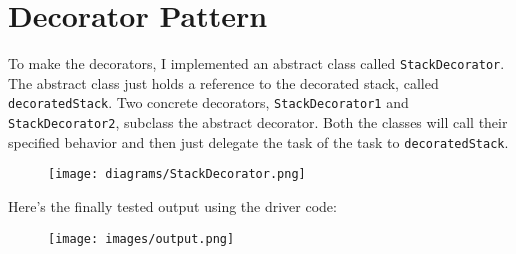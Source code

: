 \documentclass[english,12pt]{article}
\begin{document}
\section*{Decorator Pattern}
To make the decorators, I implemented an abstract class called \texttt{StackDecorator}.
The abstract class just holds a reference to the decorated stack, called \texttt{decoratedStack}.
Two concrete decorators, \texttt{StackDecorator1} and \texttt{StackDecorator2},
subclass the abstract decorator. Both the classes will call their specified behavior
and then just delegate the task of the task to \texttt{decoratedStack}.
\begin{figure}[H]
   \texttt{[image: diagrams/StackDecorator.png]}
\end{figure}
Here's the finally tested output using the driver code:
\begin{figure}[H]
   \texttt{[image: images/output.png]}
\end{figure}
\end{document}
